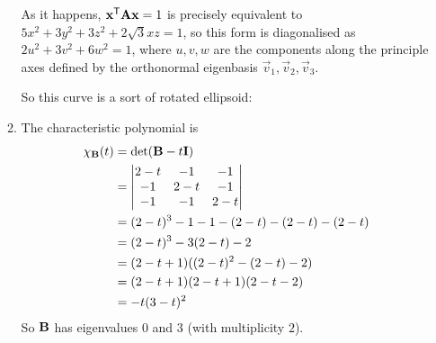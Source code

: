 \documentclass[fleqn,a4paper,11pt]{article}
\begin{document}
\begin{enumerate}[label=\textbf{\arabic*.}]
\begin{enumerate}[label=(\textbf{\Alph*})]
    As it happens, \(\mathrm{\mathbf{x}}^{\mathsf T} \mathbf{A} \mathrm{\mathbf{x}} = 1\) is precisely equivalent
    to \(5x^2 + 3y^2 + 3z^2 + 2\sqrt 3 xz = 1\), so this form is diagonalised as
    \(2u^2 + 3v^2 + 6w^2 = 1\), where \(u, v, w\) are the components along the
    principle axes defined by the orthonormal eigenbasis
    \(\vec v_1, \vec v_2, \vec v_3\).

    So this curve is a sort of rotated ellipsoid:
   \item
    The characteristic polynomial is
    \begin{align*}
     \chi_{\mathbf{B}}(t)
     &= \det(\mathbf{B} - t \mathbf{I}) \\
     &=
     \begin{vmatrix}
      2 - t & -1 & -1 \\
      -1 & 2 - t & -1 \\
      -1 & -1 & 2 - t
     \end{vmatrix} \\
     &= (2 - t)^3 - 1 - 1 - (2 - t) - (2 - t) - (2 - t) \\
     &= (2 - t)^3 - 3(2 - t) - 2 \\
     &= (2 - t + 1)((2 - t)^2 - (2 - t) - 2) \\
     &= (2 - t + 1)(2 - t + 1)(2 - t-  2) \\
     &= -t(3 - t)^2
    \end{align*}
    So \(\mathbf{B}\) has eigenvalues \(0\) and \(3\) (with multiplicity \(2\)).


\end{enumerate}
\end{enumerate}
\end{document}
